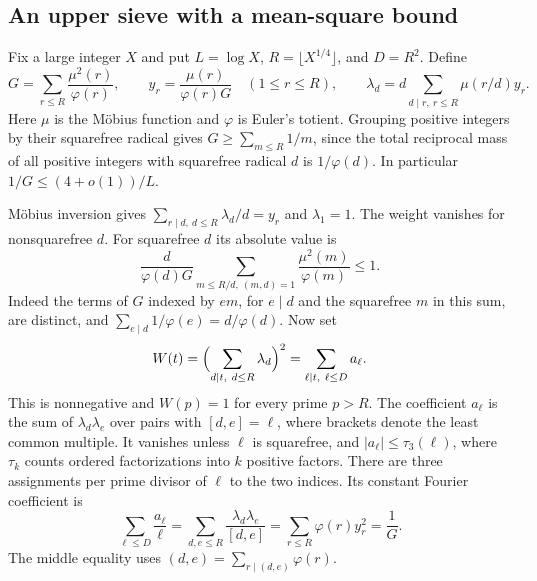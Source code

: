 \documentclass[11pt,a4paper]{article}
\begin{document}
\subsection{An upper sieve with a mean-square bound}
Fix a large integer $X$ and put $L=\log X$, $R=\lfloor X^{1/4}\rfloor$,
and $D=R^2$. Define
\[
 G=\sum_{r\le R}\frac{\mu^2(r)}{\varphi(r)},\qquad
 y_r=\frac{\mu(r)}{\varphi(r)G}\quad(1\le r\le R),\qquad
 \lambda_d=d\sum_{d\mid r,\ r\le R}\mu(r/d)y_r.
\]
Here $\mu$ is the M\"obius function and $\varphi$ is Euler's totient.
Grouping positive integers by their squarefree radical gives
$G\ge\sum_{m\le R}1/m$, since the total reciprocal mass of all positive
integers with squarefree radical $d$ is $1/\varphi(d)$.
In particular $1/G\le (4+o(1))/L$.

M\"obius inversion gives $\sum_{r\mid d,\ d\le R}\lambda_d/d=y_r$ and
$\lambda_1=1$. The weight vanishes for nonsquarefree $d$. For squarefree
$d$ its absolute value is
\[
 \frac{d}{\varphi(d)G}
   \sum_{m\le R/d,\ (m,d)=1}\frac{\mu^2(m)}{\varphi(m)}\le1.
\]
Indeed the terms of $G$ indexed by $em$, for $e\mid d$ and the squarefree
$m$ in this sum, are distinct, and
$\sum_{e\mid d}1/\varphi(e)=d/\varphi(d)$.
Now set
\[
 W(t)=\Bigl(\sum_{d\mid t,\ d\le R}\lambda_d\Bigr)^2
     =\sum_{\ell\mid t,\ \ell\le D} a_\ell.
\]
This is nonnegative and $W(p)=1$ for every prime $p>R$. The
coefficient $a_\ell$ is the sum of $\lambda_d\lambda_e$ over pairs
with $[d,e]=\ell$, where brackets denote the least common multiple.
It vanishes unless $\ell$ is squarefree, and $|a_\ell|\le\tau_3(\ell)$,
where $\tau_k$ counts ordered factorizations into $k$ positive factors.
There are three assignments per prime divisor of $\ell$ to the two
indices. Its constant Fourier coefficient is
\[
 \sum_{\ell\le D}\frac{a_\ell}{\ell}
 =\sum_{d,e\le R}\frac{\lambda_d\lambda_e}{[d,e]}
 =\sum_{r\le R}\varphi(r)y_r^2=\frac1G.
\]
The middle equality uses $(d,e)=\sum_{r\mid(d,e)}\varphi(r)$.
\end{document}
